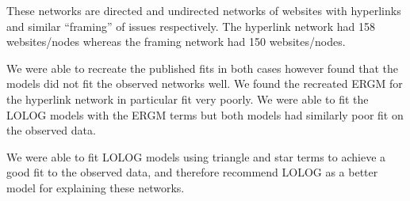 \documentclass[
]{statsoc}
\begin{document}
These networks are directed and undirected networks of websites with
hyperlinks and similar ``framing'' of issues respectively. The hyperlink
network had 158 websites/nodes whereas the framing network had 150
websites/nodes.

We were able to recreate the published fits in both cases however found
that the models did not fit the observed networks well. We found the
recreated ERGM for the hyperlink network in particular fit very poorly.
We were able to fit the LOLOG models with the ERGM terms but both models
had similarly poor fit on the observed data.

We were able to fit LOLOG models using triangle and star terms to
achieve a good fit to the observed data, and therefore recommend LOLOG
as a better model for explaining these networks.



\end{document}
